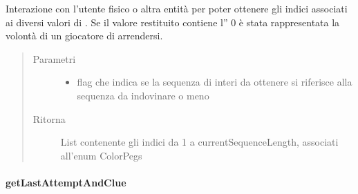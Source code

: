 \documentclass[letterpaper,10pt,italian]{sphinxmanual}
\begin{document}
\begin{fulllineitems}
\label{\detokenize{source/it/unicam/cs/pa/mastermind/ui/InteractionView:it.unicam.cs.pa.mastermind.ui.InteractionView.getIndexSequence(boolean)}}
Interazione con l’utente fisico o altra entità per poter ottenere gli indici associati ai diversi valori di . Se il valore restituito contiene l” 0 è stata rappresentata la volontà di un giocatore  di arrendersi.
\begin{quote}\begin{description}
\item[{Parametri}] \leavevmode\begin{itemize}
\item {} 
 \textendash{} flag che indica se la sequenza di interi da ottenere si riferisce alla sequenza da indovinare o meno

\end{itemize}

\item[{Ritorna}] \leavevmode
List contenente gli indici da 1 a currentSequenceLength, associati all’enum ColorPegs

\end{description}\end{quote}

\end{fulllineitems}



\paragraph{getLastAttemptAndClue}
\label{\detokenize{source/it/unicam/cs/pa/mastermind/ui/InteractionView:getlastattemptandclue}}
\end{document}

